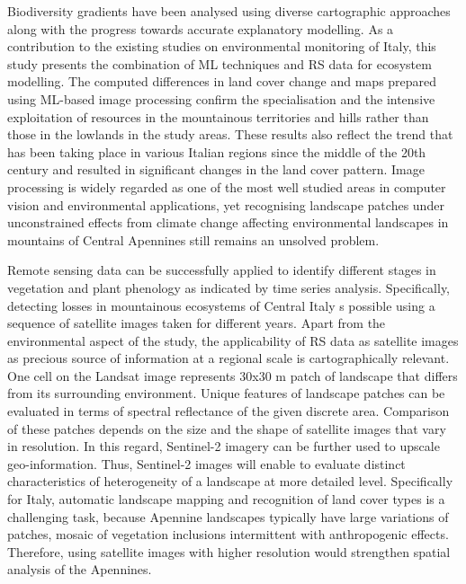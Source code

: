\documentclass[jimaging,article,accept,pdftex,oneauthor]{Definitions/mdpi}
\begin{document}
{Biodiversity} gradients have been analysed using diverse cartographic approaches {along with the} progress towards accurate explanatory modelling{. As a contribution to the existing studies on environmental monitoring of Italy, this study presents the} combination of {ML} techniques and {RS} data{ }for ecosystem modelling. The computed differences in land cover change and maps prepared using ML-based image processing confirm the specialisation and the intensive exploitation of resources in the mountainous territories and hills rather than those in the lowlands in the study areas. These results also reflect the trend that has been taking place in various Italian regions since the middle of the {20th} century and resulted in significant changes in the land cover pattern. Image processing is widely regarded as one of the most well studied areas in computer vision and environmental applications, yet recognising landscape patches under unconstrained effects from climate change affecting environmental landscapes in mountains of Central Apennines still remains an unsolved problem. 

Remote sensing data can be successfully applied to identify different stages in vegetation and plant phenology as indicated by time series analysis. Specifically, detecting losses in mountainous ecosystems of Central Italy s possible using a sequence of satellite images taken for different years. {Apart from the environmental aspect of the study, the applicability of RS data as satellite images as precious source of information at a regional scale is cartographically relevant. One cell on the Landsat image represents 30x30 m patch of landscape that differs from its surrounding environment. Unique features of landscape patches can be evaluated in terms of spectral reflectance of the given discrete area.  Comparison of these patches depends on the size and the shape of satellite images that  vary in resolution. In this regard, Sentinel-2 imagery can be further used to upscale geo-information. Thus, Sentinel-2 images will enable to evaluate distinct characteristics of heterogeneity of a landscape at more detailed level. Specifically for Italy,} automatic landscape mapping and recognition of land cover types is {a challenging task, because Apennine} landscapes typically have large variations of patches, mosaic of vegetation inclusions intermittent with anthropogenic effects. {Therefore, using satellite images with higher resolution would strengthen spatial analysis of the Apennines.}
\end{document}
